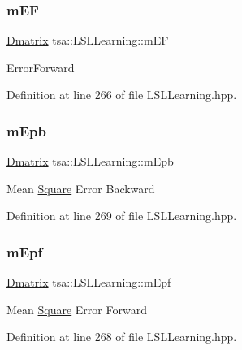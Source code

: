 \subsubsection{\texorpdfstring{m\+EF}{mEF}}
{\footnotesize\ttfamily \hyperlink{namespacetsa_ad260cd21c1891c4ed391fe788569aba4}{Dmatrix} tsa\+::\+L\+S\+L\+Learning\+::m\+EF\hspace{0.3cm}{\ttfamily [private]}}

Error\+Forward 

Definition at line 266 of file L\+S\+L\+Learning.\+hpp.

\mbox{\label{classtsa_1_1_l_s_l_learning_a4ccb655fdbbebb1a9875c6bc8238b373}} 
\subsubsection{\texorpdfstring{m\+Epb}{mEpb}}
{\footnotesize\ttfamily \hyperlink{namespacetsa_ad260cd21c1891c4ed391fe788569aba4}{Dmatrix} tsa\+::\+L\+S\+L\+Learning\+::m\+Epb\hspace{0.3cm}{\ttfamily [private]}}

Mean \hyperlink{classtsa_1_1_square}{Square} Error Backward 

Definition at line 269 of file L\+S\+L\+Learning.\+hpp.

\mbox{\label{classtsa_1_1_l_s_l_learning_a5cd2595571d70a64dfefbdd48dd96eb5}} 
\subsubsection{\texorpdfstring{m\+Epf}{mEpf}}
{\footnotesize\ttfamily \hyperlink{namespacetsa_ad260cd21c1891c4ed391fe788569aba4}{Dmatrix} tsa\+::\+L\+S\+L\+Learning\+::m\+Epf\hspace{0.3cm}{\ttfamily [private]}}

Mean \hyperlink{classtsa_1_1_square}{Square} Error Forward 

Definition at line 268 of file L\+S\+L\+Learning.\+hpp.

\mbox{\label{classtsa_1_1_l_s_l_learning_ab1e86d5df54de8730402c123caccfd30}} 
